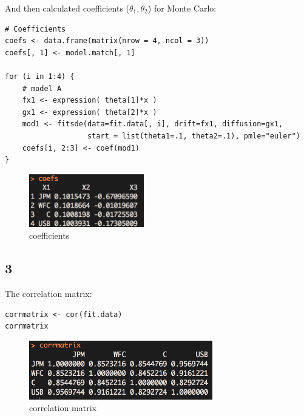 \documentclass{article}
\begin{document}
And then calculated coefficients (${\theta _1},{\theta _2}$) for Monte Carlo:

\begin{verbatim}
# Coefficients
coefs <- data.frame(matrix(nrow = 4, ncol = 3))
coefs[, 1] <- model.match[, 1]

for (i in 1:4) {
    # model A
    fx1 <- expression( theta[1]*x )
    gx1 <- expression( theta[2]*x )
    mod1 <- fitsde(data=fit.data[, i], drift=fx1, diffusion=gx1,
                   start = list(theta1=.1, theta2=.1), pmle="euler")
    coefs[i, 2:3] <- coef(mod1)
}
\end{verbatim}

\begin{figure}[h] 
\begin{center} 
\includegraphics[width = 5cm]{coefs.png}  
\caption{coefficients} 
\end{center} 
\end{figure}

\subsection{3}

The correlation matrix:
\begin{verbatim}
corrmatrix <- cor(fit.data)
corrmatrix
\end{verbatim}

\begin{figure}[h] 
\begin{center} 
\includegraphics[width = 8cm]{corr.png}  
\caption{correlation matrix} 
\end{center} 
\end{figure}
\end{document}
